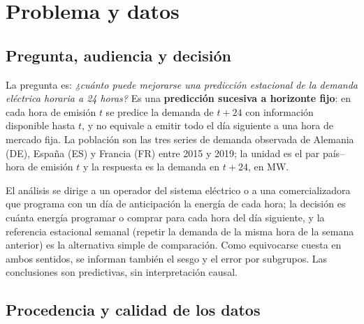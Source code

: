 \section{Problema y datos}

\subsection{Pregunta, audiencia y decisión}

La pregunta es: \emph{¿cuánto puede mejorarse una predicción estacional de la demanda eléctrica horaria a 24 horas?} Es una \textbf{predicción sucesiva a horizonte fijo}: en cada hora de emisión $t$ se predice la demanda de $t+24$ con información disponible hasta $t$, y no equivale a emitir todo el día siguiente a una hora de mercado fija. La población son las tres series de demanda observada de Alemania (DE), España (ES) y Francia (FR) entre 2015 y 2019; la unidad es el par país--hora de emisión $t$ y la respuesta es la demanda en $t+24$, en MW.

El análisis se dirige a un operador del sistema eléctrico o a una comercializadora que programa con un día de anticipación la energía de cada hora; la decisión es cuánta energía programar o comprar para cada hora del día siguiente, y la referencia estacional semanal (repetir la demanda de la misma hora de la semana anterior) es la alternativa simple de comparación. Como equivocarse cuesta en ambos sentidos, se informan también el sesgo y el error por subgrupos. Las conclusiones son predictivas, sin interpretación causal.

\subsection{Procedencia y calidad de los datos}

